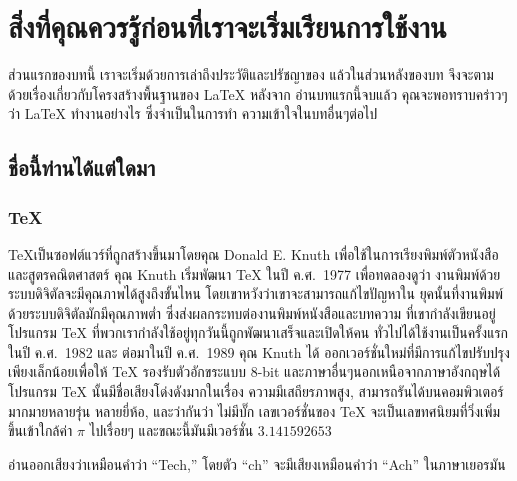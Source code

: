 
\chapter[สิ่งที่คุณควรรู้\ldots]{สิ่งที่คุณควรรู้ก่อนที่เราจะเริ่มเรียนการใช้งาน \LaTeXe}
ส่วนแรกของบทนี้ เราจะเริ่มด้วยการเล่าถึงประวัติและปรัชญาของ \LaTeXe{}
แล้วในส่วนหลังของบท จึงจะตามด้วยเรื่องเกี่ยวกับโครงสร้างพื้นฐานของ \LaTeX{} หลังจาก%
อ่านบทแรกนี้จบแล้ว คุณจะพอทราบคร่าวๆว่า \LaTeX{} ทำงานอย่างไร ซึ่งจำเป็นในการทำ%
ความเข้าใจในบทอื่นๆต่อไป

\section{ชื่อนี้ท่านได้แต่ใดมา}

\subsection{\TeX}

\TeX เป็นซอฟต์แวร์ที่ถูกสร้างขึ้นมาโดยคุณ Donald E. Knuth เพื่อใช้ในการเรียงพิมพ์ตัวหนังสือ
และสูตรคณิตศาสตร์ คุณ Knuth เริ่มพัฒนา \TeX{} ในปี ค.ศ.\ 1977 เพื่อทดลองดูว่า%
งานพิมพ์ด้วยระบบดิจิตัลจะมีคุณภาพได้สูงถึงขั้นไหน โดยเขาหวังว่าเขาจะสามารถแก้ไขปัญหาใน%
ยุคนั้นที่งานพิมพ์ด้วยระบบดิจิตัลมักมีคุณภาพต่ำ ซึ่งส่งผลกระทบต่องานพิมพ์หนังสือและบทความ%
ที่เขากำลังเขียนอยู่ โปรแกรม \TeX{} ที่พวกเรากำลังใช้อยู่ทุกวันนี้ถูกพัฒนาเสร็จและเปิดให้คน%
ทั่วไปได้ใช้งานเป็นครั้งแรกในปี ค.ศ.\ 1982 และ ต่อมาในปี ค.ศ.\ 1989 คุณ Knuth ได้%
ออกเวอร์ชั่นใหม่ที่มีการแก้ไขปรับปรุงเพียงเล็กน้อยเพื่อให้ \TeX{} รองรับตัวอักขระแบบ 8-bit
และภาษาอื่นๆนอกเหนือจากภาษาอังกฤษได้ โปรแกรม \TeX{} นั้นมีชื่อเสียงโด่งดังมากในเรื่อง%
ความมีเสถียรภาพสูง, สามารถรันได้บนคอมพิวเตอร์มากมายหลายรุ่น หลายยี่ห้อ, และว่ากันว่า%
ไม่มีบั๊ก เลขเวอร์ชั่นของ \TeX{} จะเป็นเลขทศนิยมที่วิ่งเพิ่มขึ้นเข้าใกล้ค่า $\pi$ ไปเรื่อยๆ
และขณะนี้มันมีเวอร์ชั่น $3.141592653$

\Tex{} อ่านออกเสียงว่าเหมือนคำว่า ``Tech,'' โดยตัว ``ch'' จะมีเสียงเหมือนคำว่า ``Ach''
ในภาษาเยอรมัน

\shbtoaddmoretranslation
